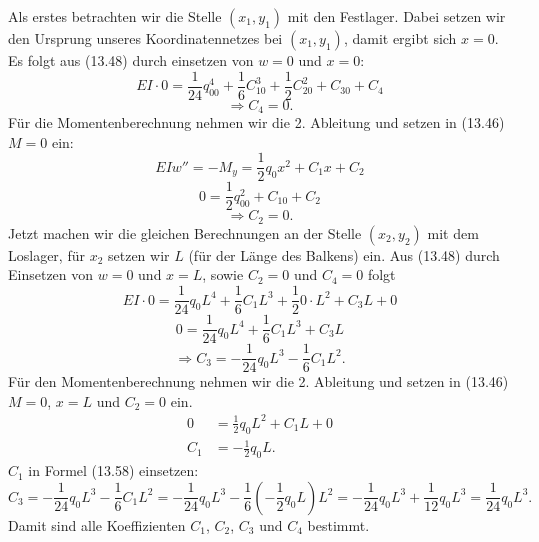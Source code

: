 Als erstes betrachten wir die Stelle $(x_1, y_1)$ mit den Festlager.
Dabei setzen wir den Ursprung unseres Koordinatennetzes bei $(x_1, y_1)$, damit ergibt sich $x = 0$. Es folgt aus (13.48) durch einsetzen von $w = 0$ und $x = 0$:
\begin{equation}
	EI\cdot0=
	\frac{1}{24}q_00^4+\frac{1}{6}C_10^3+\frac{1}{2}C_20^2+C_30+C_4
\end{equation}
\begin{equation}
	\Rightarrow C_4=
	0.
\end{equation}
Für die Momentenberechnung nehmen wir die 2. Ableitung und setzen in (13.46) $M = 0$ ein:
\begin{equation}
	EIw''=
	-M_y=
	\frac{1}{2}q_0x^2+C_1x+C_2
\end{equation}
\begin{equation}
	0=
	\frac{1}{2}q_00^2+C_10+C_2
\end{equation}
\begin{equation}
	\Rightarrow C_2=
	0.
\end{equation}
Jetzt machen wir die gleichen Berechnungen an der Stelle $(x_2, y_2)$ mit dem Loslager, für $x_2$ setzen wir $L$ (für der Länge des Balkens) ein. Aus (13.48) durch Einsetzen von $w = 0$ und $x = L$, sowie $C_2 = 0$ und $C_4 = 0$ folgt
\begin{equation}
	EI\cdot0=
	\frac{1}{24}q_0L^4+\frac{1}{6}C_1L^3+\frac{1}{2}0\cdot L^2+C_3L+0
\end{equation}
\begin{equation}
	0=
	\frac{1}{24}q_0L^4+\frac{1}{6}C_1L^3+C_3L
\end{equation}
\begin{equation}
	\Rightarrow C_3=
	-\frac{1}{24}q_0L^3-\frac{1}{6}C_1L^2.
\end{equation}
Für den Momentenberechnung nehmen wir die 2. Ableitung und setzen in (13.46) $M = 0$, $x = L$ und $C_2 = 0$ ein.
\begin{align}
		0 &=
		\frac{1}{2}q_0L^2+C_1L+0
    \\
		C_1&=
		-\frac{1}{2}q_0L.
\end{align}
$C_1$ in Formel (13.58) einsetzen:
\begin{equation}
	C_3=
	-\frac{1}{24}q_0L^3-\frac{1}{6}C_1L^2
	=	-\frac{1}{24}q_0L^3-\frac{1}{6}\left(-\frac{1}{2}q_0L\right)L^2
	=	-\frac{1}{24}q_0L^3+\frac{1}{12}q_0L^3
	=	\frac{1}{24}q_0L^3.
\end{equation}
Damit sind alle Koeffizienten $C_1$, $C_2$, $C_3$ und $C_4$ bestimmt.

